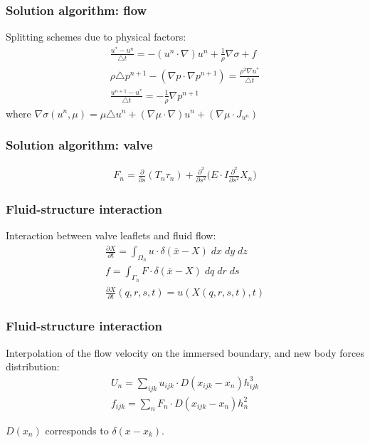 \documentclass[14pt]{beamer}
\begin{document}
\begin{frame}
\frametitle{Solution algorithm: flow}
Splitting schemes due to physical factors:
\begin{gather}
    \label{eq:split_first}
    \frac{u^* - u^n}{\triangle t} = - (u^n \cdot \nabla) u^n + \frac{1}{\rho} \nabla \sigma + f\\
    \label{eq:split_second}
    \rho \triangle p^{n+1} - (\nabla p \cdot \nabla p^{n+1}) = \frac{\rho^2 \nabla u^*}{\triangle t}\\
    \label{eq:split_third}
    \frac{u^{n+1} - u^*}{\triangle t} = - \frac{1}{\rho} \nabla p^{n+1}
\end{gather}
where $\nabla \sigma (u^n, \mu) = \mu \triangle u^n + (\nabla \mu \cdot \nabla) u^n + (\nabla \mu \cdot J_{u^n}) $
\end{frame}


\begin{frame}
\frametitle{Solution algorithm: valve}
\begin{gather}
    \label{eq:strain_energy}
    F_{n} =  \frac{\partial}{\partial s}(T_{n} \tau_{n}) + \frac{\partial^2}{\partial s^2} \Big( E \cdot I \frac{\partial^2}{\partial s^2} X_{n} \Big)
\end{gather}
\end{frame}


\begin{frame}
\frametitle{Fluid-structure interaction}
Interaction between valve leaflets and fluid flow:
\begin{gather}
    \label{eq:ibm_velocity}
    \frac{\partial X}{\partial t} = \int_{\Omega_h} u \cdot \delta (\bar{x} - X)\; dx\; dy\; dz \\
    \label{eq:ibm_force}
    f = \int_{\Gamma_h} F \cdot \delta (\bar{x} - X)\; dq\; dr\; ds\\
    \label{eq:no_slip}
    \frac{\partial X}{\partial t} (q, r, s, t) = u(X(q, r, s, t), t)
\end{gather}
\end{frame}

\begin{frame}
\frametitle{Fluid-structure interaction}
Interpolation of the flow velocity on the immersed boundary, and new body forces distribution:
\begin{gather}
    \label{eq:interpolation}
    U_n = \sum_{ijk}u_{ijk} \cdot D(x_{ijk} - x_n) h_{ijk}^3 \\
    \label{eq:spreading}
    f_{ijk} = \sum_n F_n \cdot D(x_{ijk} - x_n) h^2_n
\end{gather}

$D(x_n)$ corresponds to $\delta(x - x_k)$.
\end{frame}
\end{document}
